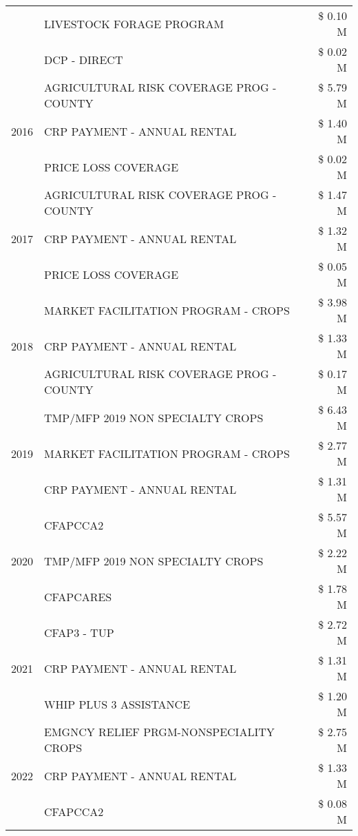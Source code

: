 \begin{tabular}{llr}
 & LIVESTOCK FORAGE PROGRAM & \$ 0.10 M \\
 & DCP - DIRECT & \$ 0.02 M \\
\cline{1-3}
\multirow[t]{3}{*}{2016} & AGRICULTURAL RISK COVERAGE PROG - COUNTY & \$ 5.79 M \\
 & CRP PAYMENT - ANNUAL RENTAL & \$ 1.40 M \\
 & PRICE LOSS COVERAGE & \$ 0.02 M \\
\cline{1-3}
\multirow[t]{3}{*}{2017} & AGRICULTURAL RISK COVERAGE PROG - COUNTY & \$ 1.47 M \\
 & CRP PAYMENT - ANNUAL RENTAL & \$ 1.32 M \\
 & PRICE LOSS COVERAGE & \$ 0.05 M \\
\cline{1-3}
\multirow[t]{3}{*}{2018} & MARKET FACILITATION PROGRAM - CROPS & \$ 3.98 M \\
 & CRP PAYMENT - ANNUAL RENTAL & \$ 1.33 M \\
 & AGRICULTURAL RISK COVERAGE PROG - COUNTY & \$ 0.17 M \\
\cline{1-3}
\multirow[t]{3}{*}{2019} & TMP/MFP 2019 NON SPECIALTY CROPS & \$ 6.43 M \\
 & MARKET FACILITATION PROGRAM - CROPS & \$ 2.77 M \\
 & CRP PAYMENT - ANNUAL RENTAL & \$ 1.31 M \\
\cline{1-3}
\multirow[t]{3}{*}{2020} & CFAPCCA2 & \$ 5.57 M \\
 & TMP/MFP 2019 NON SPECIALTY CROPS & \$ 2.22 M \\
 & CFAPCARES & \$ 1.78 M \\
\cline{1-3}
\multirow[t]{3}{*}{2021} & CFAP3 - TUP & \$ 2.72 M \\
 & CRP PAYMENT - ANNUAL RENTAL & \$ 1.31 M \\
 & WHIP PLUS 3 ASSISTANCE & \$ 1.20 M \\
\cline{1-3}
\multirow[t]{3}{*}{2022} & EMGNCY RELIEF PRGM-NONSPECIALITY CROPS & \$ 2.75 M \\
 & CRP PAYMENT - ANNUAL RENTAL & \$ 1.33 M \\
 & CFAPCCA2 & \$ 0.08 M \\
\cline{1-3}
\bottomrule
\end{tabular}
